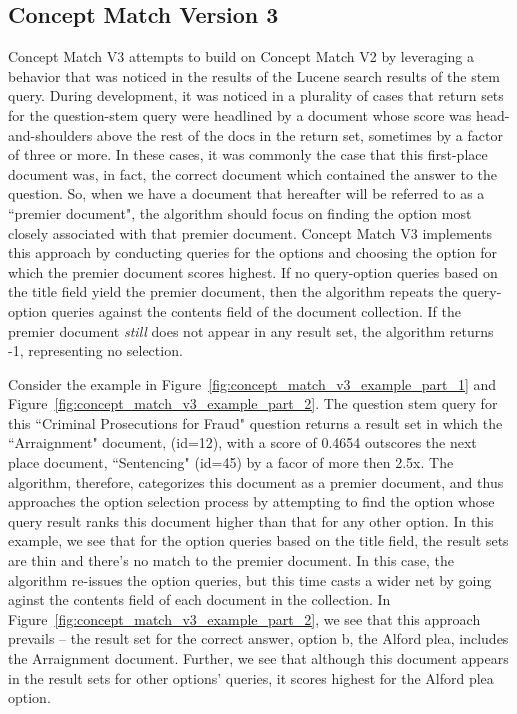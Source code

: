 \subsection{Concept Match Version 3}

Concept Match V3 attempts to build on Concept Match V2 by leveraging a behavior that was noticed in the results of the Lucene search results of the stem query.  
During development, it was noticed in a plurality of cases that  return sets for the question-stem query were headlined by a document whose score was head-and-shoulders above the rest of the docs in the return set, sometimes by a factor of three or more.  In these cases, it was commonly the case that this first-place document was, in fact, the correct document which contained the answer to the question.  So, when we have a document that hereafter will be referred to as a  ``premier document", the algorithm should focus on finding the option most closely associated with that premier document.  Concept Match V3 implements this approach by conducting queries for the options and choosing the option for which the premier document scores highest.  If no query-option queries based on the title field yield the premier document, then the algorithm repeats the query-option queries against the contents field of the document collection.  If the premier document \emph{still} does not appear in any result set, the algorithm returns -1, representing no selection.

Consider the example in Figure~\ref{fig:concept_match_v3_example_part_1} and Figure~\ref{fig:concept_match_v3_example_part_2}.  The question stem query for this ``Criminal Prosecutions for Fraud" question returns a result set in which the ``Arraignment" document, (id=12), with a score of 0.4654 outscores the next place document, ``Sentencing" (id=45) by a facor of more then 2.5x.  The algorithm, therefore,  categorizes this document as a premier document, and thus approaches the option selection process by attempting to find the option whose query result ranks this document higher than that for any other option.  In this example, we see that for the option queries based on the title field, the result sets are thin and there's no match to the premier document.  In this case, the algorithm re-issues the option queries, but this time casts a wider net by going aginst the contents field of each document in the collection.  In Figure~\ref{fig:concept_match_v3_example_part_2}, we see that this approach prevails -- the result set for the correct answer, option b, the Alford plea, includes the Arraignment document.  Further, we see that although this document appears in the result sets for other options' queries, it scores highest for the Alford plea option.


